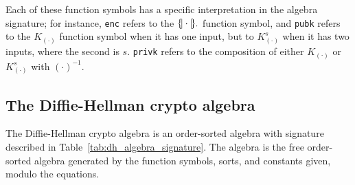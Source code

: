 Each of these function symbols has a specific interpretation in the
algebra signature; for instance, \texttt{enc} refers to the
$\{\!|\cdot|\!\}_{\cdot}$ function symbol, and \texttt{pubk} refers to the
$K_{(\cdot)}$ function symbol when it has one input, but to
$K^s_{(\cdot)}$ when it has two inputs, where the second is $s$.
\texttt{privk} refers to the composition of either $K_{(\cdot)}$ or
$K^s_{(\cdot)}$ with $(\cdot)^{-1}$.

\subsection{The Diffie-Hellman crypto algebra}
\label{sec:input:dh}

The Diffie-Hellman crypto algebra is an order-sorted algebra with signature
described in Table~\ref{tab:dh_algebra_signature}.  The algebra is
the free order-sorted algebra generated by the function symbols,
sorts, and constants given, modulo the equations.

